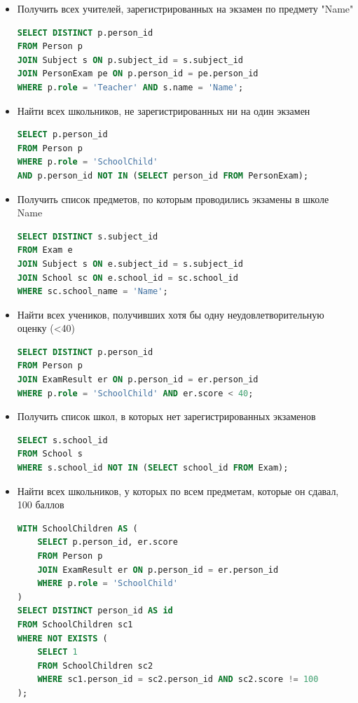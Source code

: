 \documentclass[a4paper]{article}
\begin{document}
\begin{itemize}
      \item Получить всех учителей, зарегистрированных на экзамен по предмету "Name"
            \begin{lstlisting}[language=SQL, label={lst:sql-example}, frame=none, numbers=none]
SELECT DISTINCT p.person_id
FROM Person p
JOIN Subject s ON p.subject_id = s.subject_id
JOIN PersonExam pe ON p.person_id = pe.person_id
WHERE p.role = 'Teacher' AND s.name = 'Name';
            \end{lstlisting}

      \item Найти всех школьников, не зарегистрированных ни на один экзамен
            \begin{lstlisting}[language=SQL, label={lst:sql-example}, frame=none, numbers=none]
SELECT p.person_id
FROM Person p
WHERE p.role = 'SchoolChild' 
AND p.person_id NOT IN (SELECT person_id FROM PersonExam);
\end{lstlisting}

      \item Получить список предметов, по которым проводились экзамены в школе Name
            \begin{lstlisting}[language=SQL, label={lst:sql-example}, frame=none, numbers=none]
SELECT DISTINCT s.subject_id
FROM Exam e
JOIN Subject s ON e.subject_id = s.subject_id
JOIN School sc ON e.school_id = sc.school_id
WHERE sc.school_name = 'Name';
            \end{lstlisting}

      \item Найти всех учеников, получивших хотя бы одну неудовлетворительную оценку (<40)
            \begin{lstlisting}[language=SQL, label={lst:sql-example}, frame=none, numbers=none]
SELECT DISTINCT p.person_id
FROM Person p
JOIN ExamResult er ON p.person_id = er.person_id
WHERE p.role = 'SchoolChild' AND er.score < 40;
            \end{lstlisting}

      \item Получить список школ, в которых нет зарегистрированных экзаменов
            \begin{lstlisting}[language=SQL, label={lst:sql-example}, frame=none, numbers=none]
SELECT s.school_id
FROM School s
WHERE s.school_id NOT IN (SELECT school_id FROM Exam);
\end{lstlisting}

      \item Найти всех школьников, у которых по всем предметам, которые он сдавал, 100 баллов
            \begin{lstlisting}[language=SQL, label={lst:sql-example}, frame=none, numbers=none]
WITH SchoolChildren AS (
    SELECT p.person_id, er.score
    FROM Person p
    JOIN ExamResult er ON p.person_id = er.person_id
    WHERE p.role = 'SchoolChild'
)
SELECT DISTINCT person_id AS id
FROM SchoolChildren sc1
WHERE NOT EXISTS (
    SELECT 1 
    FROM SchoolChildren sc2 
    WHERE sc1.person_id = sc2.person_id AND sc2.score != 100
);
            \end{lstlisting}


\end{itemize}
\end{document}
